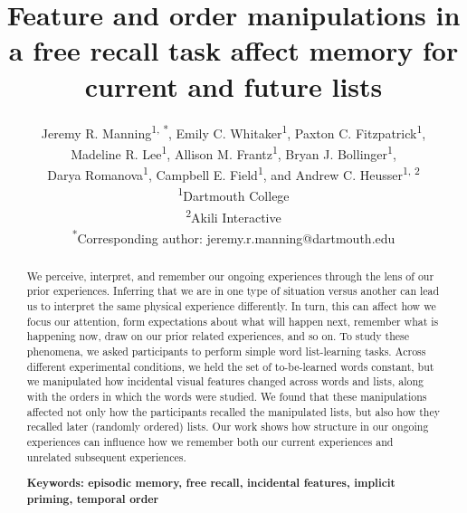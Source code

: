 \documentclass[11pt]{article}
\title{\Large Feature and order manipulations in a free recall task affect memory for current and future lists}
\author{Jeremy R. Manning\textsuperscript{1, *}, Emily C.
Whitaker\textsuperscript{1}, Paxton C. Fitzpatrick\textsuperscript{1},
\\Madeline R. Lee\textsuperscript{1}, Allison M. Frantz\textsuperscript{1},
Bryan J. Bollinger\textsuperscript{1},\\Darya Romanova\textsuperscript{1},
Campbell E. Field\textsuperscript{1}, and Andrew C. Heusser\textsuperscript{1,
2}\\\textsuperscript{1}Dartmouth College\\\textsuperscript{2}Akili
Interactive \DIFaddbegin \DIFadd{Labs}\DIFaddend \\\textsuperscript{*}Corresponding author:
jeremy.r.manning@dartmouth.edu}
\date{}
\providecommand{\DIFaddbegin}{} %
\providecommand{\DIFaddend}{} %
\providecommand{\DIFdelbegin}{} %
\providecommand{\DIFdelend}{} %
\newcommand{\DIFscaledelfig}{0.5}
\newlength{\DIFdelgraphicswidth} %
\newlength{\DIFdelgraphicsheight} %
\newcommand{\DIFaddincludegraphics}[2][]{{\color{blue}\fbox{\DIFOincludegraphics[#1]{#2}}}} %
\newcommand{\DIFdelincludegraphics}[2][]{%
\sbox{\DIFdelgraphicsbox}{\DIFOincludegraphics[#1]{#2}}%
\settoboxwidth{\DIFdelgraphicswidth}{\DIFdelgraphicsbox} %
\settoboxtotalheight{\DIFdelgraphicsheight}{\DIFdelgraphicsbox} %
\scalebox{\DIFscaledelfig}{%
\parbox[b]{\DIFdelgraphicswidth}{\usebox{\DIFdelgraphicsbox}\\[-\baselineskip] \rule{\DIFdelgraphicswidth}{0em}}\llap{\resizebox{\DIFdelgraphicswidth}{\DIFdelgraphicsheight}{%
\setlength{\unitlength}{\DIFdelgraphicswidth}%
\begin{picture}(1,1)%
\thicklines\linethickness{2pt} %
{\color[rgb]{1,0,0}\put(0,0){\framebox(1,1){}}}%
{\color[rgb]{1,0,0}\put(0,0){\line( 1,1){1}}}%
{\color[rgb]{1,0,0}\put(0,1){\line(1,-1){1}}}%
\end{picture}%
}\hspace*{3pt}}} %
} %
\DeclareRobustCommand{\DIFaddbegin}{\DIFOaddbegin \let\includegraphics\DIFaddincludegraphics} %
\DeclareRobustCommand{\DIFaddend}{\DIFOaddend \let\includegraphics\DIFOincludegraphics} %
\DeclareRobustCommand{\DIFdelbegin}{\DIFOdelbegin \let\includegraphics\DIFdelincludegraphics} %
\DeclareRobustCommand{\DIFdelend}{\DIFOaddend \let\includegraphics\DIFOincludegraphics} %
\begin{document}
\maketitle
\DIFaddbegin \thispagestyle{empty}
\DIFaddend 

\begin{abstract} \DIFdelbegin %

\DIFdelend \DIFaddbegin \footnotesize{We perceive, interpret, and remember our ongoing
experiences through the lens of our prior experiences. Inferring that we are in
one type of situation versus another can lead us to interpret the same physical
experience differently. In turn, this can affect how we focus our attention,
form expectations about what will happen next, remember what is happening now,
draw on our prior related experiences, and so on. To study these phenomena, we
asked participants to perform simple word list-learning tasks. Across different
experimental conditions, we held the set of to-be-learned words constant, but
we manipulated how incidental visual features changed across words and lists,
along with the orders in which the words were studied. We found that these
manipulations affected not only how the participants recalled the manipulated
lists, but also how they recalled later (randomly ordered) lists. Our work
shows how structure in our ongoing experiences can influence how we remember
both our current experiences and unrelated subsequent experiences.

\textbf{Keywords: episodic memory, free recall, incidental features, implicit
priming, temporal order}}
\DIFaddend 

\end{abstract}
\end{document}
